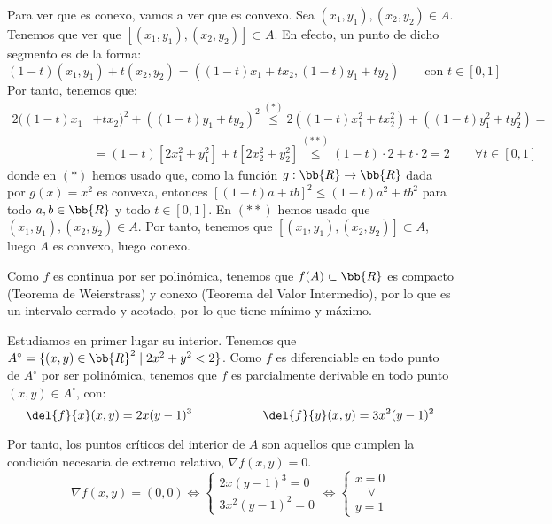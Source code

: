 \begin{ejercicio}
    Para ver que es conexo, vamos a ver que es convexo. Sea $(x_1,y_1), (x_2,y_2)\in A$. Tenemos que ver que $[(x_1,y_1), (x_2,y_2)]\subset A$.
    En efecto, un punto de dicho segmento es de la forma:
    \begin{equation*}
        (1-t)(x_1,y_1)+t(x_2,y_2) = ((1-t)x_1+tx_2, (1-t)y_1+ty_2) \qquad \text{con } t\in [0,1]
    \end{equation*}
    Por tanto, tenemos que:
    \begin{equation*}
        \begin{split}
            2((1-t)x_1&+tx_2)^2 + ((1-t)y_1+ty_2)^2
            \stackrel{(\ast)}{\leq}
            2((1-t)x_1^2+tx_2^2) + ((1-t)y_1^2+ty_2^2)
            =\\&= (1-t)[2x_1^2+y_1^2] + t[2x_2^2+y_2^2]
            \stackrel{(\ast\ast)}{\leq} (1-t)\cdot 2 + t\cdot 2 = 2
            \qquad \forall t\in [0,1]
        \end{split}
    \end{equation*}
    donde en $(\ast)$ hemos usado que, como la función
    $g:\bb{R}\to \bb{R}$ dada por $g(x)=x^2$ es convexa, entonces
    $[(1-t)a + tb]^2 \leq (1-t)a^2 + tb^2$ para todo $a,b\in \bb{R}$ y todo $t\in [0,1]$.
    En $(\ast\ast)$ hemos usado que $(x_1,y_1), (x_2,y_2)\in A$.
    Por tanto, tenemos que $[(x_1,y_1), (x_2,y_2)]\subset A$, luego $A$ es convexo, luego conexo.

    Como $f$ es continua por ser polinómica, tenemos que $f(A)\subset \bb{R}$ es compacto (Teorema de Weierstrass) y conexo (Teorema del Valor Intermedio), por lo que es un intervalo cerrado y acotado, por lo que tiene mínimo y máximo.

    Estudiamos en primer lugar su interior. Tenemos que $A^\circ = \{(x,y)\in \bb{R}^2\mid 2x^2+y^2< 2\}$. Como $f$ es diferenciable en todo punto de $A^\circ$ por ser polinómica, tenemos que $f$ es parcialmente derivable en todo punto $(x,y)\in A^\circ$, con:
    \begin{equation*}
        \del{f}{x}(x,y) = 2x(y-1)^3 \hspace{2cm}
        \del{f}{y}(x,y) = 3x^2(y-1)^2
    \end{equation*}

    Por tanto, los puntos críticos del interior de $A$ son aquellos que cumplen la condición necesaria de extremo relativo, $\nabla f(x,y)=0$.
    \begin{equation*}
        \nabla f(x,y) = (0,0) \Longleftrightarrow
        \begin{cases}
            2x(y-1)^3 = 0 \\
            3x^2(y-1)^2 = 0
        \end{cases}
        \Longleftrightarrow
        \begin{cases}
            x=0 \\
            \quad \lor \\
            y=1
        \end{cases}
    \end{equation*}


\end{ejercicio}
